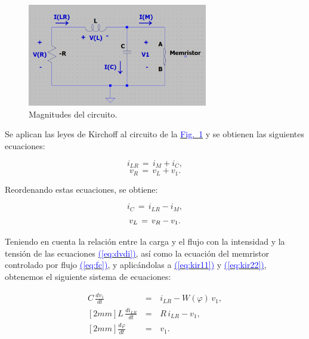 \documentclass[12pt,a4paper]{report} %
\newcommand{\fref}[1]{\hyperref[#1]{\textcolor{blue}{Fig.~\ref*{#1}}}}
\newcommand{\eref}[1]{\hyperref[#1]{\textcolor{blue}{(\ref*{#1})}}}
\newcommand{\fref}[1]{\hyperref[#1]{\textcolor{blue}{\textit{Fig.~\ref*{#1}}}}}
\newcommand{\eref}[1]{\hyperref[#1]{\textcolor{blue}{\textit{(\ref*{#1})}}}}
\begin{document}
	\vspace{0.5cm}\begin{figure}[h]
		\centering
		\includegraphics[width=0.7\textwidth]{circuito.png}
		\caption{Magnitudes del circuito.}
		\label{fig:circuito}
	\end{figure}\smallskip
	
	\vspace{0.5cm}\noindent Se aplican las leyes de Kirchoff al circuito de la \fref{fig:circuito} y se obtienen las siguientes ecuaciones:
	
	\begin{equation}
		i_{LR}\,=\,i_M+i_C,
		\label{eq:kir1}
	\end{equation}\smallskip
	\begin{equation}
		v_R\,=\,v_L+v_1.
		\label{eq:kir2}
	\end{equation}\smallskip
	
		\vspace{0.5cm}\noindent Reordenando estas ecuaciones, se obtiene:
	
	\begin{equation}
		i_C\,=\,i_{LR}-i_M,
		\label{eq:kir11}
	\end{equation}\smallskip
	\begin{equation}\smallskip
		v_L\,=\,v_R-v_1.
		\label{eq:kir22}
	\end{equation}
	
	\newpage
	
	\noindent Teniendo en cuenta la relación entre la carga y el flujo con la intensidad y la tensión de las ecuaciones \eref{eq:dvdi}, así como la ecuación del memristor controlado por flujo \eref{eq:fc}, y aplicándolas a \eref{eq:kir11} y \eref{eq:kir22}, obtenemos el siguiente sistema de ecuaciones:
	
	\begin{eqnarray}
		C\,\frac{dv_1}{dt}\,&=&\,i_{LR}-W(\varphi)\,v_1 \label{eq:kir111}, \\ [2mm]
		L\,\frac{di_{LR}}{dt}\,&=&\,R\,i_{LR}-v_1 \label{eq:kir222}, \\ [2mm]
		\frac{d\varphi}{dt}\,&=&\,v_1. \label{eq:kir333}
	\end{eqnarray}\smallskip
	
\end{document}
